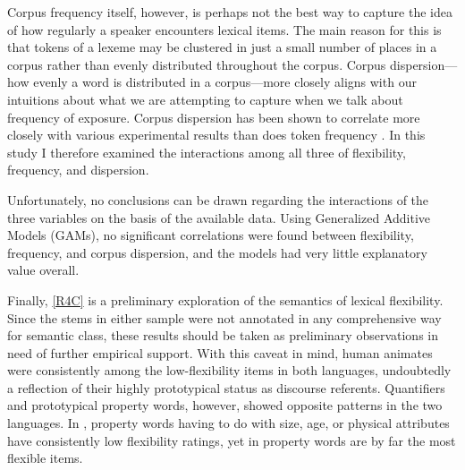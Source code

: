 Corpus frequency itself, however, is perhaps not the best way to capture the idea of how regularly a speaker encounters lexical items. The main reason for this is that tokens of a lexeme may be clustered in just a small number of places in a corpus rather than evenly distributed throughout the corpus. Corpus dispersion—how evenly a word is distributed in a corpus—more closely aligns with our intuitions about what we are attempting to capture when we talk about frequency of exposure. Corpus dispersion has been shown to correlate more closely with various experimental results than does token frequency \parencites{Gries2008}{Gries2010}{Griesfc}. In this study I therefore examined the interactions among all three of flexibility, frequency, and dispersion.

Unfortunately, no conclusions can be drawn regarding the interactions of the three variables on the basis of the available data. Using Generalized Additive Models (GAMs), no significant correlations were found between flexibility, frequency, and corpus dispersion, and the models had very little explanatory value overall.

Finally, \ref{R4C} is a preliminary exploration of the semantics of lexical flexibility. Since the stems in either sample were not annotated in any comprehensive way for semantic class, these results should be taken as preliminary observations in need of further empirical support. With this caveat in mind, human animates were consistently among the low-flexibility items in both languages, undoubtedly a reflection of their highly prototypical status as discourse referents. Quantifiers and prototypical property words, however, showed opposite patterns in the two languages. In , property words having to do with size, age, or physical attributes have consistently low flexibility ratings, yet in  property words are by far the most flexible items.

